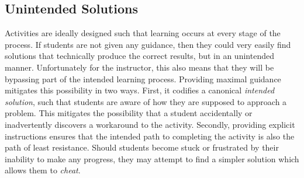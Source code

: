     \subsection{Unintended Solutions}
        Activities are ideally designed such that learning occurs at every stage of the process. 
        If students are not given any guidance, then they could very easily find solutions that technically produce the correct results, but in an unintended manner. 
        Unfortunately for the instructor, this also means that they will be bypassing part of the intended learning process. 
        Providing maximal guidance mitigates this possibility in two ways. 
        First, it codifies a canonical \emph{intended solution}, such that students are aware of how they are supposed to approach a problem. 
        This mitigates the possibility that a student accidentally or inadvertently discovers a workaround to the activity. 
        Secondly, providing explicit instructions ensures that the intended path to completing the activity is also the path of least resistance. 
        Should students become stuck or frustrated by their inability to make any progress, they may attempt to find a simpler solution which allows them to \emph{cheat}. 




        

